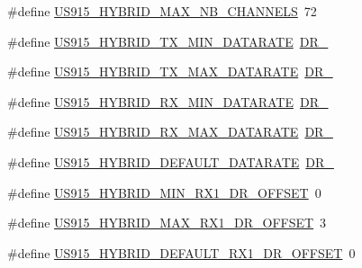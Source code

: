 \begin{DoxyCompactItemize}
\item 
\#define \mbox{\hyperlink{group___r_e_g_i_o_n_u_s915_h_y_b_ga977b73cbf7a5d15e2bf543fad5f35710}{U\+S915\+\_\+\+H\+Y\+B\+R\+I\+D\+\_\+\+M\+A\+X\+\_\+\+N\+B\+\_\+\+C\+H\+A\+N\+N\+E\+LS}}~72
\item 
\#define \mbox{\hyperlink{group___r_e_g_i_o_n_u_s915_h_y_b_ga6c7ab6789cb7bb1a5c1e22833905f787}{U\+S915\+\_\+\+H\+Y\+B\+R\+I\+D\+\_\+\+T\+X\+\_\+\+M\+I\+N\+\_\+\+D\+A\+T\+A\+R\+A\+TE}}~\mbox{\hyperlink{group___r_e_g_i_o_n_ga6c4ef966b4f3d5eb7597b087f2b97095}{D\+R\+\_}}
\item 
\#define \mbox{\hyperlink{group___r_e_g_i_o_n_u_s915_h_y_b_ga41872f6bb20d1dca0b778205ada36348}{U\+S915\+\_\+\+H\+Y\+B\+R\+I\+D\+\_\+\+T\+X\+\_\+\+M\+A\+X\+\_\+\+D\+A\+T\+A\+R\+A\+TE}}~\mbox{\hyperlink{group___r_e_g_i_o_n_ga6ceba6158a7dab238e9d0b846fb47a0c}{D\+R\+\_}}
\item 
\#define \mbox{\hyperlink{group___r_e_g_i_o_n_u_s915_h_y_b_gaf3c327837e52fbc665c3857f3731c5fe}{U\+S915\+\_\+\+H\+Y\+B\+R\+I\+D\+\_\+\+R\+X\+\_\+\+M\+I\+N\+\_\+\+D\+A\+T\+A\+R\+A\+TE}}~\mbox{\hyperlink{group___r_e_g_i_o_n_ga44cc96ba80ae464cd9330b784d329c16}{D\+R\+\_}}
\item 
\#define \mbox{\hyperlink{group___r_e_g_i_o_n_u_s915_h_y_b_ga10a143c061143776288b241e17c1b58d}{U\+S915\+\_\+\+H\+Y\+B\+R\+I\+D\+\_\+\+R\+X\+\_\+\+M\+A\+X\+\_\+\+D\+A\+T\+A\+R\+A\+TE}}~\mbox{\hyperlink{group___r_e_g_i_o_n_ga226f47470cc69a6fe831f7c92709bc1f}{D\+R\+\_}}
\item 
\#define \mbox{\hyperlink{group___r_e_g_i_o_n_u_s915_h_y_b_ga1ab202b7df1ef278c238dd8958ea0d8a}{U\+S915\+\_\+\+H\+Y\+B\+R\+I\+D\+\_\+\+D\+E\+F\+A\+U\+L\+T\+\_\+\+D\+A\+T\+A\+R\+A\+TE}}~\mbox{\hyperlink{group___r_e_g_i_o_n_ga6c4ef966b4f3d5eb7597b087f2b97095}{D\+R\+\_}}
\item 
\#define \mbox{\hyperlink{group___r_e_g_i_o_n_u_s915_h_y_b_ga526b61da154115ac916e9f217d50cd07}{U\+S915\+\_\+\+H\+Y\+B\+R\+I\+D\+\_\+\+M\+I\+N\+\_\+\+R\+X1\+\_\+\+D\+R\+\_\+\+O\+F\+F\+S\+ET}}~0
\item 
\#define \mbox{\hyperlink{group___r_e_g_i_o_n_u_s915_h_y_b_ga1e70e7e114c0fd6bf905085e78def426}{U\+S915\+\_\+\+H\+Y\+B\+R\+I\+D\+\_\+\+M\+A\+X\+\_\+\+R\+X1\+\_\+\+D\+R\+\_\+\+O\+F\+F\+S\+ET}}~3
\item 
\#define \mbox{\hyperlink{group___r_e_g_i_o_n_u_s915_h_y_b_ga314e35b76742b3b9ba602e5e2bbcba3f}{U\+S915\+\_\+\+H\+Y\+B\+R\+I\+D\+\_\+\+D\+E\+F\+A\+U\+L\+T\+\_\+\+R\+X1\+\_\+\+D\+R\+\_\+\+O\+F\+F\+S\+ET}}~0

\end{DoxyCompactItemize}
